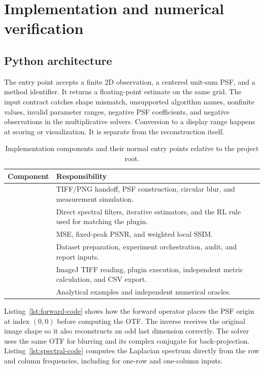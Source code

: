 \section{Implementation and numerical verification}
\label{sec:implementation}

\subsection{Python architecture}

The entry point  accepts a finite 2D observation, a centered unit-sum PSF, and a method identifier. It returns a floating-point estimate on the same grid. The input contract catches shape mismatch, unsupported algorithm names, nonfinite values, invalid parameter ranges, negative PSF coefficients, and negative observations in the multiplicative solvers. Conversion to a display range happens at scoring or visualization. It is separate from the reconstruction itself.

\begin{table}[!htbp]
\centering
\caption{Implementation components and their normal entry points relative to the project root.}
\small
\begin{tabularx}{\linewidth}{@{}p{.38\linewidth}Y@{}}
\toprule Component & Responsibility\\\midrule
{} & TIFF/PNG handoff, PSF construction, circular blur, and measurement simulation.\\
 & Direct spectral filters, iterative estimators, and the RL rule used for matching the plugin.\\
 & MSE, fixed-peak PSNR, and weighted local SSIM.\\
 & Dataset preparation, experiment orchestration, audit, and report inputs.\\
 & ImageJ TIFF reading, plugin execution, independent metric calculation, and CSV export.\\
 & Analytical examples and independent numerical oracles.\\
\bottomrule
\end{tabularx}
\end{table}

Listing~\ref{lst:forward-code} shows how the forward operator places the PSF origin at index \((0,0)\) before computing the OTF. The inverse  receives the original image shape so it also reconstructs an odd last dimension correctly. The solver uses the same OTF for blurring and its complex conjugate for back-projection. Listing~\ref{lst:spectral-code} computes the Laplacian spectrum directly from the row and column frequencies, including for one-row and one-column inputs.

